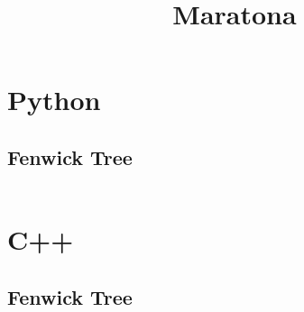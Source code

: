 \documentclass{article}
\title{Maratona}
\author{}
\date{}
\begin{document}
\maketitle
\tableofcontents
\newpage

\section{Python}
\subsection{Fenwick Tree}
\inputminted{python}{code/fenwick.py}
\section{C++}
\subsection{Fenwick Tree}
\inputminted{cpp}{code/fenwick.cpp}
\end{document}
